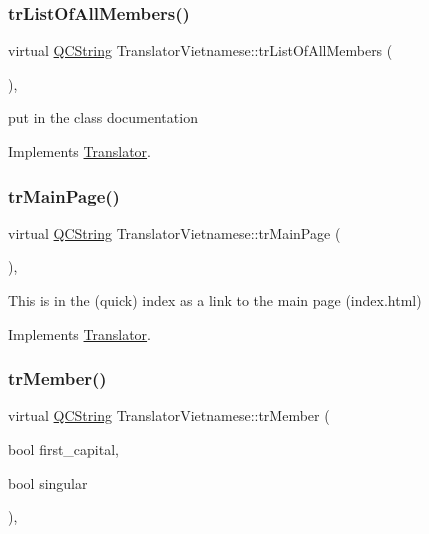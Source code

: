 \subsubsection{\texorpdfstring{trListOfAllMembers()}{trListOfAllMembers()}}
{\footnotesize\ttfamily virtual \mbox{\hyperlink{class_q_c_string}{Q\+C\+String}} Translator\+Vietnamese\+::tr\+List\+Of\+All\+Members (\begin{DoxyParamCaption}{ }\end{DoxyParamCaption})\hspace{0.3cm}{\ttfamily [inline]}, {\ttfamily [virtual]}}

put in the class documentation 

Implements \mbox{\hyperlink{class_translator}{Translator}}.

\mbox{\label{class_translator_vietnamese_ad11c072a404e5ecfebd28e02dc662621}} 
\subsubsection{\texorpdfstring{trMainPage()}{trMainPage()}}
{\footnotesize\ttfamily virtual \mbox{\hyperlink{class_q_c_string}{Q\+C\+String}} Translator\+Vietnamese\+::tr\+Main\+Page (\begin{DoxyParamCaption}{ }\end{DoxyParamCaption})\hspace{0.3cm}{\ttfamily [inline]}, {\ttfamily [virtual]}}

This is in the (quick) index as a link to the main page (index.\+html) 

Implements \mbox{\hyperlink{class_translator}{Translator}}.

\mbox{\label{class_translator_vietnamese_a86ea38ab14f2d911e804d2cf818fba36}} 
\subsubsection{\texorpdfstring{trMember()}{trMember()}}
{\footnotesize\ttfamily virtual \mbox{\hyperlink{class_q_c_string}{Q\+C\+String}} Translator\+Vietnamese\+::tr\+Member (\begin{DoxyParamCaption}\item[{bool}]{first\+\_\+capital,  }\item[{bool}]{singular }\end{DoxyParamCaption})\hspace{0.3cm}{\ttfamily [inline]}, {\ttfamily [virtual]}}

